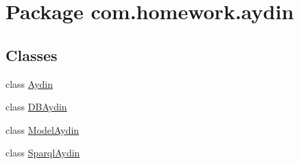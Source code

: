 \hypertarget{namespacecom_1_1homework_1_1aydin}{}\section{Package com.\+homework.\+aydin}
\label{namespacecom_1_1homework_1_1aydin}
\subsection*{Classes}
\begin{DoxyCompactItemize}
\item 
class \hyperlink{classcom_1_1homework_1_1aydin_1_1_aydin}{Aydin}
\item 
class \hyperlink{classcom_1_1homework_1_1aydin_1_1_d_b_aydin}{D\+B\+Aydin}
\item 
class \hyperlink{classcom_1_1homework_1_1aydin_1_1_model_aydin}{Model\+Aydin}
\item 
class \hyperlink{classcom_1_1homework_1_1aydin_1_1_sparql_aydin}{Sparql\+Aydin}
\end{DoxyCompactItemize}
